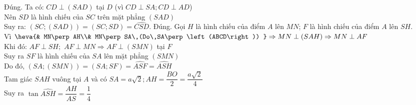 \begin{ex}
{\begin{itemchoice}
   \itemch Đúng. 
   Ta có: $  CD\perp\left(SAD\right)$ tại $ D$ (vì $ CD\perp SA;CD\perp AD$)\\
   Nên $ SD$ là hình chiếu của $ SC$ trên mặt  phẳng $\left(SAD\right)$\\
   Suy ra: $\left(SC;\left(SAD\right)\right)=\left(SC;SD\right)=\widehat{CSD}$. \itemch  Đúng.
   Gọi $ H$ là hình chiếu của điểm $ A$ lên $ MN$; $  F$ là hình chiếu của điểm $ A$ lên $ SH$.\\
   Vì $\heva{& 
    MN\perp AH\\&
   MN\perp  SA\,(Do\,SA\perp\left(ABCD\right))
   }\Rightarrow MN\perp\left(SAH\right)\Rightarrow MN\perp  AF$\\
   Khi đó: $ AF\perp SH;$ $ AF\perp MN\Rightarrow AF\perp\left(SMN\right)$ tại $ F$\\ Suy ra $  SF$ là hình chiếu của $ SA$ lên mặt phẳng $\left(SMN\right)$\\
   Do đó,  $\left(SA;\left(SMN\right)\right)=\left(SA;SF\right)=\widehat{ASF}=\widehat{ASH}$\\
    Tam giác $ SAH$ vuông tại $ A$ và có $ SA=a\sqrt 2;AH=\dfrac{BO}{2}=\dfrac{a\sqrt 2}{4}$\\
   Suy  ra $\tan\widehat{ASH}=\dfrac{AH}{AS}=\dfrac{1}{4}$
 \end{itemchoice}}
\end{ex}

